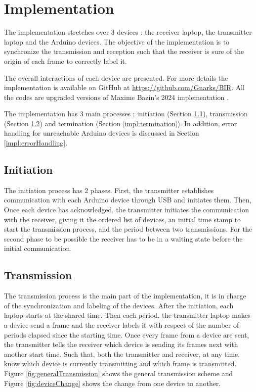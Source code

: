 \documentclass[a4paper, 12pt]{article}
\begin{document}
\section{Implementation}\label{Impl}
The implementation stretches over 3 devices : the receiver laptop, the transmitter laptop and the Arduino devices. The objective of the implementation is to synchronize the transmission and reception such that the receiver is sure of the origin of each frame to correctly label it. 

The overall interactions of each device are presented. For more details the implementation is available on GitHub at \url{https://github.com/Gnarks/BIR}. All the codes are upgraded versions of Maxime Bazin's 2024 implementation \cite{kazawai}. 

The implementation has 3 main processes : initiation (Section \ref{impl:initiation}), transmission (Section \ref{impl:transmission}) and termination (Section \ref{impl:termination}).
In addition, error handling for unreachable Arduino devices is discussed in Section \ref{impl:errorHandling}.


\subsection{Initiation}\label{impl:initiation}
The initiation process has 2 phases. First, the transmitter establishes communication with each Arduino device through USB and initiates them. Then, Once each device has acknowledged, the transmitter initiates the communication with the receiver, giving it the ordered list of devices, an initial time stamp to start the transmission process, and the period between two transmissions. For the second phase to be possible the receiver has to be in a waiting state before the initial communication.

\subsection{Transmission}\label{impl:transmission}
The transmission process is the main part of the implementation, it is in charge of the synchronization and labeling of the devices.
After the initiation, each laptop starts at the shared time. Then each period, the transmitter laptop makes a device send a frame and the receiver labels it with respect of the number of periods elapsed since the starting time.
Once every frame from a device are sent, the transmitter tells the receiver which device is sending its frames next with another start time.   
Such that, both the transmitter and receiver, at any time, know which device is currently transmitting and which frame is transmitted. \\
Figure \ref{fig:generalTransmission} shows the general transmission scheme and Figure \ref{fig:deviceChange} shows the change from one device to another.
\end{document}
